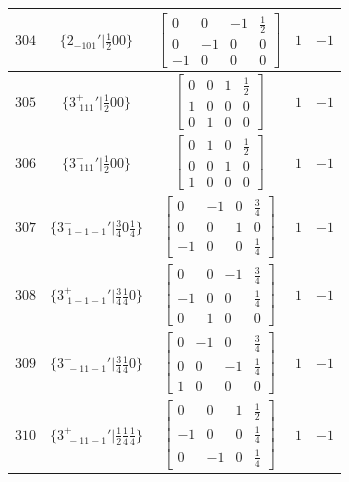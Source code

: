 \documentclass[fleqn,8pt]{jsarticle}
\begin{document}
\begin{longtable}{ccccc}
$ 304 $ & $ \{2{}_{-101}{}'|\frac{1}{2} 0 0\} $ & $ \begin{bmatrix} 0 & 0 & -1 & \frac{1}{2} \\ 0 & -1 & 0 & 0 \\ -1 & 0 & 0 & 0 \end{bmatrix} $ & $ 1 $ & $ -1 $ \\ \hline
$ 305 $ & $ \{3^{+}_{\,\,111}{}'|\frac{1}{2} 0 0\} $ & $ \begin{bmatrix} 0 & 0 & 1 & \frac{1}{2} \\ 1 & 0 & 0 & 0 \\ 0 & 1 & 0 & 0 \end{bmatrix} $ & $ 1 $ & $ -1 $ \\ \hline
$ 306 $ & $ \{3^{-}_{\,\,111}{}'|\frac{1}{2} 0 0\} $ & $ \begin{bmatrix} 0 & 1 & 0 & \frac{1}{2} \\ 0 & 0 & 1 & 0 \\ 1 & 0 & 0 & 0 \end{bmatrix} $ & $ 1 $ & $ -1 $ \\ \hline
$ 307 $ & $ \{3^{-}_{\,\,1-1-1}{}'|\frac{3}{4} 0 \frac{1}{4}\} $ & $ \begin{bmatrix} 0 & -1 & 0 & \frac{3}{4} \\ 0 & 0 & 1 & 0 \\ -1 & 0 & 0 & \frac{1}{4} \end{bmatrix} $ & $ 1 $ & $ -1 $ \\ \hline
$ 308 $ & $ \{3^{+}_{\,\,1-1-1}{}'|\frac{3}{4} \frac{1}{4} 0\} $ & $ \begin{bmatrix} 0 & 0 & -1 & \frac{3}{4} \\ -1 & 0 & 0 & \frac{1}{4} \\ 0 & 1 & 0 & 0 \end{bmatrix} $ & $ 1 $ & $ -1 $ \\ \hline
$ 309 $ & $ \{3^{-}_{\,\,-11-1}{}'|\frac{3}{4} \frac{1}{4} 0\} $ & $ \begin{bmatrix} 0 & -1 & 0 & \frac{3}{4} \\ 0 & 0 & -1 & \frac{1}{4} \\ 1 & 0 & 0 & 0 \end{bmatrix} $ & $ 1 $ & $ -1 $ \\ \hline
$ 310 $ & $ \{3^{+}_{\,\,-11-1}{}'|\frac{1}{2} \frac{1}{4} \frac{1}{4}\} $ & $ \begin{bmatrix} 0 & 0 & 1 & \frac{1}{2} \\ -1 & 0 & 0 & \frac{1}{4} \\ 0 & -1 & 0 & \frac{1}{4} \end{bmatrix} $ & $ 1 $ & $ -1 $ \\ \hline

\end{longtable}
\end{document}
